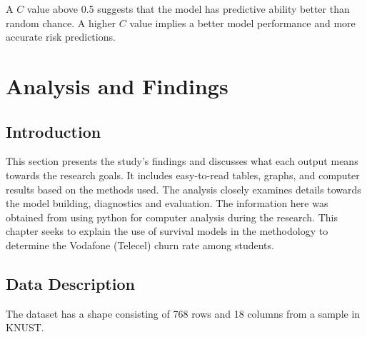 \documentclass[doublespacing]{report} %
\begin{document}
A \(C\) value above 0.5 suggests that the model has predictive ability better than random chance. A higher \(C\) value implies a better model performance and more accurate risk predictions.



\newpage
\chapter{Analysis and Findings}
\section{Introduction}

This section presents the study's findings and discusses what each output means towards the research goals. It includes easy-to-read tables, graphs, and computer results based on the methods used. The analysis closely examines details towards the model building, diagnostics and evaluation. The information here was obtained from using python for computer analysis during the research. This chapter seeks to explain the use of survival models in the methodology to determine the Vodafone (Telecel) churn rate among students.

\section{Data Description}

The dataset has a shape consisting of 768 rows and 18 columns from a sample in KNUST.
\end{document}
